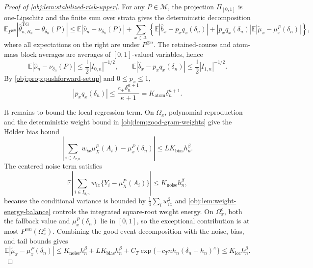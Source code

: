\begin{proof}[Proof of \cref{obj:lem:stabilized-risk-upper}]
For any \(P\in\mathcal M\), the projection \(\Pi_{[0,1]}\) is one-Lipschitz and the finite sum over strata gives the deterministic decomposition
\[
\mathbb E_{P^{\otimes n}}
\left|\widehat\theta^{\mathrm{TG}}_{n,B_n}-\theta_{\delta_n}(P)\right|
\le
\mathbb E|\widehat\nu_n-\nu_{\delta_n}(P)|
+
\sum_{x\in\mathcal X}
\left\{
\mathbb E|\widehat b_x-p_xq_x(\delta_n)|
+
|p_xq_x(\delta_n)|
\mathbb E|\widetilde\mu_x-\mu_x^P(\delta_n)|
\right\},
\]
where all expectations on the right are under \(P^{\otimes n}\). %
The retained-course and atom-mass block averages are averages of \([0,1]\)-valued variables, hence
\[
\mathbb E|\widehat\nu_n-\nu_{\delta_n}(P)|
\le
\frac12 |I_{0,n}|^{-1/2},
\qquad
\mathbb E|\widehat b_x-p_xq_x(\delta_n)|
\le
\frac12 |I_{1,n}|^{-1/2}.
\]
By \cref{obj:prop:pushforward-setup} and \(0\le p_x\le1\),
\[
|p_xq_x(\delta_n)|
\le
\frac{c_+\delta_n^{\kappa+1}}{\kappa+1}
=
K_{\mathrm{atom}}\delta_n^{\kappa+1}.
\]

It remains to bound the local regression term.  On \(\Omega_x\), polynomial reproduction and the deterministic weight bound in \cref{obj:lem:good-gram-weights} give the Hölder bias bound
\[
\left|
\sum_{i\in I_{2,n}}w_{ix}\mu_X^P(A_i)-\mu_x^P(\delta_n)
\right|
\le
LK_{\mathrm{bias}}h_n^\beta .
\]
The centered noise term satisfies
\[
\mathbb E
\left|
\sum_{i\in I_{2,n}}w_{ix}
\{Y_i-\mu_X^P(A_i)\}
\right|
\le
K_{\mathrm{noise}}h_n^\beta,
\]
because the conditional variance is bounded by \(\frac14\sum_i w_{ix}^2\) and
\cref{obj:lem:weight-energy-balance} controls the integrated square-root weight energy. %
On \(\Omega_x^c\), both the fallback value and \(\mu_x^P(\delta_n)\) lie in \([0,1]\), so the exceptional contribution is at most \(P^{\otimes n}(\Omega_x^c)\).  Combining the good-event decomposition with the noise, bias, and tail bounds gives
\[
\mathbb E|\widetilde\mu_x-\mu_x^P(\delta_n)|
\le
K_{\mathrm{noise}}h_n^\beta+LK_{\mathrm{bias}}h_n^\beta
+C_T\exp\{-c_T n h_n(\delta_n+h_n)^\kappa\}
\le
K_{\mathrm{loc}}h_n^\beta .
\]


\end{proof}
